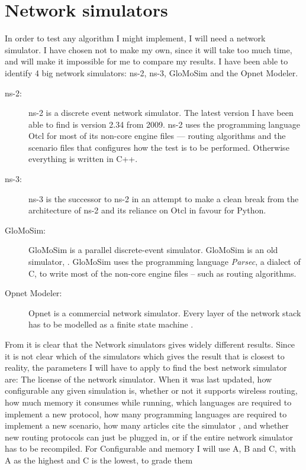 \section{Network simulators}
\label{section:network_simulators}

In order to test any algorithm I might implement, I will need a network simulator. I have chosen not to make my own, since it will take too much time, and will make it impossible for me to compare my results. I have been able to identify 4 big network simulators: ns-2, ns-3, GloMoSim and the Opnet Modeler.

\begin{description}
\item[ns-2:] ns-2 is a discrete event network simulator. The latest version I have been able to find is version 2.34 from 2009. ns-2 uses the programming language Otcl for most of its non-core engine files ---  routing algorithms and the scenario files that configures how the test is to be performed. Otherwise everything is written in C++.
\item[ns-3:] ns-3 is the successor to ns-2 in an attempt to make a clean break from the architecture of ns-2 and its reliance on Otcl in favour for Python.
\item[GloMoSim:] GloMoSim is a parallel discrete-event simulator. GloMoSim is an old simulator, . GloMoSim uses the programming language \emph{Parsec}, a dialect of C, to write most of the non-core engine files -- such as routing algorithms. 
\item[Opnet Modeler:] Opnet is a commercial network simulator. Every layer of the network stack has to be modelled as a finite state machine \cite{MANcom}. 
\end{description}

From \cite{MANcom} it is clear that the Network simulators gives widely different results. Since it is not clear which of the simulators which gives the result that is closest to reality, the parameters I will have to apply to find the best network simulator are: The license of the network simulator. When it was last updated, how configurable any given simulation is, whether or not it supports wireless routing, how much memory it consumes while running, which languages are required to implement a new protocol, how many programming languages are required to implement a new scenario, how many articles cite the simulator , and whether new routing protocols can just be plugged in, or if the entire network simulator has to be recompiled. For Configurable and memory I will use A, B and C, with A as the highest and C is the lowest, to grade them

